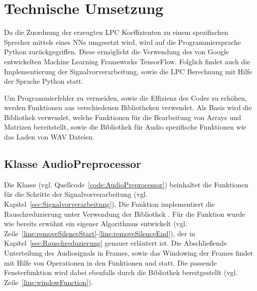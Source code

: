 \section{Technische Umsetzung}\label{sec:TechnischeUmsetzung}
Da die Zuordnung der erzeugten \ac{LPC} Koeffizienten zu einem spezifischen Sprecher mittels eines \acp{NN} umgesetzt wird, wird auf die Programmiersprache Python zurückgegriffen.
Diese ermöglicht die Verwendung des von Google entwickelten Machine Learning Frameworks TensorFlow.
Folglich findet auch die Implementierung der Signalvorverarbeitung, sowie die \ac{LPC} Berechnung mit Hilfe der Sprache Python statt.

Um Programmierfehler zu vermeiden, sowie die Effizienz des Codes zu erhöhen, werden Funktionen aus verschiedenen Bibliotheken verwendet.
Als Basis wird die Bibliothek  verwendet, welche Funktionen für die Bearbeitung von Arrays und Matrizen bereitstellt, sowie die Bibliothek  für Audio spezifische Funktionen wie das Laden von WAV Dateien.

\subsection{Klasse AudioPreprocessor}
Die Klasse  (vgl. Quellcode~\ref{code:AudioPreprocessor}) beinhaltet die Funktionen für die Schritte der Signalvorverarbeitung (vgl. Kapitel~\ref{sec:Signalvorverarbeitung}).
Die Funktion  implementiert die Rauschreduzierung unter Verwendung der Bibliothek .
Für die Funktion  wurde wie bereits erwähnt ein eigener Algorithmus entwickelt (vgl. Zeile~\ref{line:removeSilenceStart}-\ref{line:removeSilenceEnd}), der in Kapitel~\ref{sec:Rauschreduzierung} genauer erläutert ist.
Die Abschließende Unterteilung des Audiosignals in Frames, sowie das Windowing der Frames findet mit Hilfe von  Operationen in den Funktionen  und  statt.
Die passende Fensterfunktion wird dabei ebenfalls durch die   Bibliothek bereitgestellt (vgl. Zeile~\ref{line:windowFunction}).

